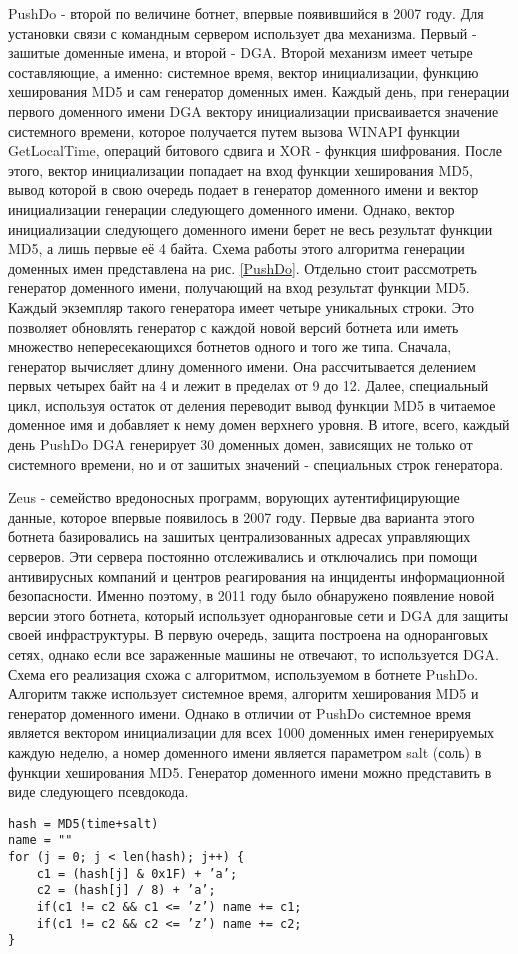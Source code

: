 PushDo - второй по величине ботнет, впервые появившийся в 2007 году. Для установки связи с командным сервером использует два механизма. Первый - зашитые доменные имена, и второй - DGA. Второй механизм имеет четыре составляющие, а именно: системное время, вектор инициализации, функцию хеширования MD5 и сам генератор доменных имен. Каждый день, при генерации первого доменного имени DGA вектору инициализации присваивается значение системного времени, которое получается путем вызова WINAPI функции GetLocalTime, операций битового сдвига и XOR - функция шифрования. После этого, вектор инициализации попадает на вход функции хеширования MD5, вывод которой в свою очередь подает в генератор доменного имени и вектор инициализации генерации следующего доменного имени. Однако, вектор инициализации следующего доменного имени берет не весь результат функции MD5, а лишь первые её 4 байта. Схема работы этого алгоритма генерации доменных имен представлена на рис. \ref{PushDo}.
Отдельно стоит рассмотреть генератор доменного имени, получающий на вход результат функции MD5. Каждый экземпляр такого генератора имеет четыре уникальных строки. Это позволяет обновлять генератор с каждой новой версий ботнета или иметь множество непересекающихся ботнетов одного и того же типа. Сначала, генератор вычисляет длину доменного имени. Она рассчитывается делением первых четырех байт на 4 и лежит в пределах от 9 до 12. Далее, специальный цикл, используя остаток от деления переводит вывод функции MD5 в читаемое доменное имя и добавляет к нему домен верхнего уровня. В итоге, всего, каждый день PushDo DGA генерирует 30 доменных домен, зависящих не только от системного времени, но и от зашитых значений - специальных строк генератора.

Zeus - семейство вредоносных программ, ворующих аутентифицирующие данные, которое впервые появилось в 2007 году. Первые два варианта этого ботнета базировались на зашитых централизованных адресах управляющих серверов. Эти сервера постоянно отслеживались и отключались при помощи антивирусных компаний и центров реагирования на инциденты информационной безопасности. Именно поэтому, в 2011 году было обнаружено появление новой версии этого ботнета, который использует одноранговые сети и DGA для защиты своей инфраструктуры. В первую очередь, защита построена на одноранговых сетях, однако если все зараженные машины не отвечают, то используется DGA. Схема его реализация схожа с алгоритмом, используемом в ботнете PushDo. Алгоритм также использует системное время, алгоритм хеширования MD5 и генератор доменного имени. Однако в отличии от PushDo системное время является вектором инициализации для всех 1000 доменных имен генерируемых каждую неделю, а номер доменного имени является параметром salt (соль) в функции хеширования MD5. Генератор доменного имени можно представить в виде следующего псевдокода.
\begin{lstlisting}
hash = MD5(time+salt)
name = ""
for (j = 0; j < len(hash); j++) {
    c1 = (hash[j] & 0x1F) + ’a’;
    c2 = (hash[j] / 8) + ’a’;
    if(c1 != c2 && c1 <= ’z’) name += c1;
    if(c1 != c2 && c2 <= ’z’) name += c2;
}
\end{lstlisting}

